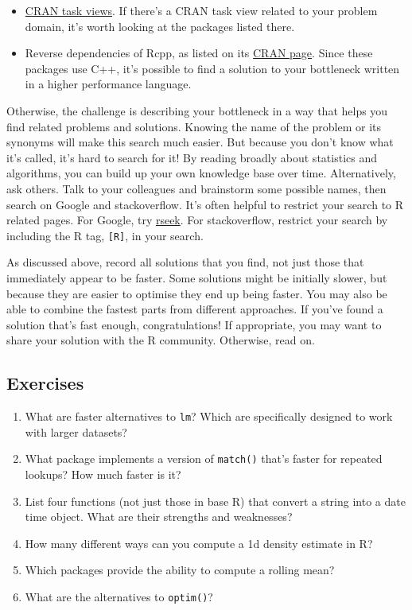 \begin{itemize}
\item
  \href{http://cran.rstudio.com/web/views/}{CRAN task views}. If there's
  a CRAN task view related to your problem domain, it's worth looking at
  the packages listed there.
\item
  Reverse dependencies of Rcpp, as listed on its
  \href{http://cran.r-project.org/web/packages/Rcpp}{CRAN page}. Since
  these packages use C++, it's possible to find a solution to your
  bottleneck written in a higher performance language.
\end{itemize}

Otherwise, the challenge is describing your bottleneck in a way that
helps you find related problems and solutions. Knowing the name of the
problem or its synonyms will make this search much easier. But because
you don't know what it's called, it's hard to search for it! By reading
broadly about statistics and algorithms, you can build up your own
knowledge base over time. Alternatively, ask others. Talk to your
colleagues and brainstorm some possible names, then search on Google and
stackoverflow. It's often helpful to restrict your search to R related
pages. For Google, try \href{http://www.rseek.org/}{rseek}. For
stackoverflow, restrict your search by including the R tag,
\texttt{{[}R{]}}, in your search. 

As discussed above, record all solutions that you find, not just those
that immediately appear to be faster. Some solutions might be initially
slower, but because they are easier to optimise they end up being
faster. You may also be able to combine the fastest parts from different
approaches. If you've found a solution that's fast enough,
congratulations! If appropriate, you may want to share your solution
with the R community. Otherwise, read on.

\subsection{Exercises}

\begin{enumerate}
\def\labelenumi{\arabic{enumi}.}
\item
  What are faster alternatives to \texttt{lm}? Which are specifically
  designed to work with larger datasets?
\item
  What package implements a version of \texttt{match()} that's faster
  for repeated lookups? How much faster is it?
\item
  List four functions (not just those in base R) that convert a string
  into a date time object. What are their strengths and weaknesses?
\item
  How many different ways can you compute a 1d density estimate in R?
\item
  Which packages provide the ability to compute a rolling mean?
\item
  What are the alternatives to \texttt{optim()}?
\end{enumerate}

